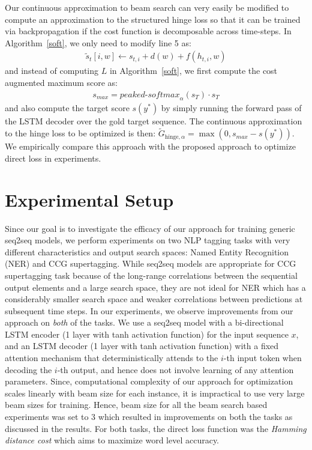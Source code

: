 \documentclass[letterpaper]{article} \usepackage{aaai18}  \usepackage{times}  \usepackage{helvet}  \usepackage{courier}  \usepackage{url}  \usepackage{graphicx}  \frenchspacing
\begin{document}
Our continuous approximation to beam search can very easily be modified to compute an approximation to the structured hinge loss so that it can be trained via backpropagation if the cost function is decomposable across time-steps. In Algorithm~\ref{soft}, we only need to modify line 5 as:
\begin{align*}
    \tilde{s}_t[i,w] \gets s_{t,i} + d(w) + f(h_{t,i},w)
\end{align*}
and instead of computing $L$ in Algorithm~\ref{soft}, we first compute the cost augmented maximum score as:
\begin{align*}
  s_{\textit{max}} = \textit{peaked-softmax}_{\alpha}(s_T) \cdot s_{T}
\end{align*}
and also compute the target score $s(y^*)$ by simply running the forward pass of the LSTM decoder over the gold target sequence. The continuous approximation to the hinge loss to be optimized is then: $\tilde{G}_{\textrm{hinge},\alpha} = \max(0,s_{\textit{max}}-s(y^*))$. We empirically compare this approach with the proposed approach to optimize direct loss in experiments.
\section{Experimental Setup}
Since our goal is to investigate the efficacy of our approach for training generic seq2seq models, we perform experiments on two NLP tagging tasks with very different characteristics and output search spaces: Named Entity Recognition (NER) and CCG supertagging. While seq2seq models are appropriate for CCG supertagging task because of the long-range correlations between the sequential output elements and a large search space, they are not ideal for NER which has a considerably smaller search space and weaker correlations between predictions at subsequent time steps. In our experiments, we observe improvements from our approach on \emph{both} of the tasks.  
We use a seq2seq model with a bi-directional LSTM encoder (1 layer with tanh activation function) for the input sequence $x$, and an LSTM decoder (1 layer with tanh activation function) with a fixed attention mechanism that deterministically attends to the $i$-th input token when decoding the $i$-th output, and hence does not involve learning of any attention parameters. Since, computational complexity of our approach for optimization scales linearly with beam size for each instance, it is impractical to use very large beam sizes for training. Hence, beam size for all the beam search based experiments was set to 3 which resulted in improvements on both the tasks as discussed in the results. For both tasks, the direct loss function was the \textit{Hamming distance cost} which aims to maximize word level accuracy.
\end{document}
